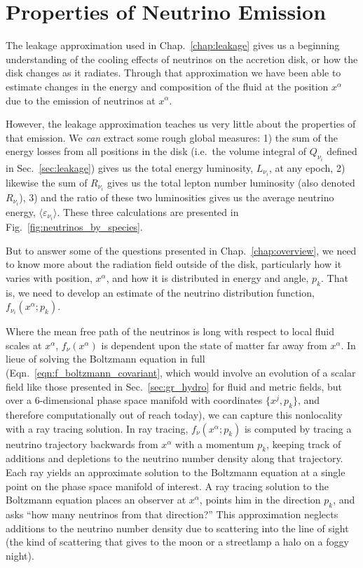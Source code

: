 \chapter{Properties of Neutrino Emission}
\label{chap:ray_tracing}

The leakage approximation used in Chap.~\ref{chap:leakage} gives us a beginning
understanding of the cooling effects of neutrinos on the accretion disk, or
how the disk changes as it radiates. Through that approximation we have been able
to estimate changes in the energy and composition of the fluid at the position
$x^\alpha$ due to the emission of neutrinos at $x^\alpha$.

However, the leakage approximation teaches us very little about the properties of
that emission. We \emph{can} extract some rough global measures:
1) the sum of the energy losses from all positions in the disk (i.e.\
the volume integral of $Q_{\nu_i}$ defined in Sec.~\ref{sec:leakage})
gives us the total energy luminosity, $L_{\nu_i}$, at any epoch,
2) likewise the sum of $R_{\nu_i}$ gives us the total lepton number luminosity
(also denoted $R_{\nu_i}$),
3) and the ratio of these two luminosities gives us the average neutrino energy,
$\langle \varepsilon_{\nu_i} \rangle$. These three calculations are presented in
Fig.~\ref{fig:neutrinos_by_species}.

But to answer some of the questions presented in Chap.~\ref{chap:overview}, we
need to know more about the radiation field outside of the disk, particularly
how it varies with position, $x^\alpha$, and how it is distributed in energy and
angle, $p_k$.
That is, we need to develop an estimate of the neutrino distribution function,
$f_{\nu_i}(x^\alpha;p_k)$.

Where the mean free path of the neutrinos is long with respect to local fluid
scales at $x^\alpha$, $f_\nu(x^\alpha)$ is dependent upon the state of matter
far away from $x^\alpha$. In lieue of solving the Boltzmann equation in full
(Eqn.~\ref{eqn:f_boltzmann_covariant},
which would involve an evolution of a scalar field like those presented in
Sec.~\ref{sec:gr_hydro} for fluid and metric fields, but over a 6-dimensional
phase space manifold with coordinates $\{x^j,p_k\}$, and therefore
computationally out of reach today),
we can capture this nonlocality with a ray tracing solution.
In ray tracing, $f_\nu(x^\alpha;p_k)$ is computed by tracing a neutrino trajectory
backwards from $x^\alpha$ with a momentum $p_k$, keeping track of additions
and depletions to the neutrino number density along that trajectory.
Each ray yields an approximate solution to the Boltzmann equation at a
single point on the phase space manifold of interest. A ray
tracing solution to the Boltzmann equation places an observer at $x^\alpha$,
points him in the direction $p_k$, and asks ``how many neutrinos from that
direction?''
This approximation neglects additions to the neutrino number density due to
scattering into the line of sight (the kind of scattering that gives to the
moon or a streetlamp a halo on a foggy night).

